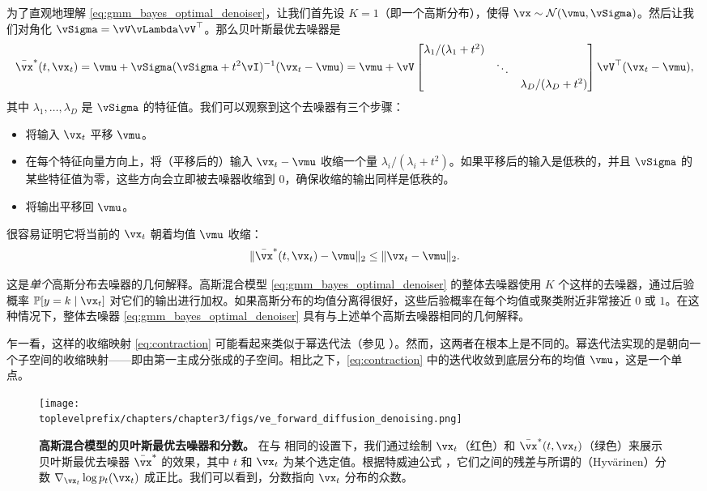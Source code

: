 \documentclass[../../book-main_zh.tex]{subfiles}
\begin{document}
\begin{example}[从高斯混合模型中去噪高斯噪声]
	为了直观地理解 \eqref{eq:gmm_bayes_optimal_denoiser}，让我们首先设 \(K = 1\)（即一个高斯分布），使得 \(\vx \sim \dNorm(\vmu, \vSigma)\)。然后让我们对角化 \(\vSigma = \vV\vLambda \vV^{\top}\)。那么贝叶斯最优去噪器是
	\begin{equation}
		\bar{\vx}^{\ast}(t, \vx_{t}) = \vmu + \vSigma(\vSigma + t^{2}\vI)^{-1}(\vx_{t} - \vmu) = \vmu + \vV\mat{\lambda_{1}/(\lambda_{1} + t^{2}) & & \\ & \ddots & \\ & & \lambda_{D}/(\lambda_{D} + t^{2})}\vV^{\top}(\vx_{t} - \vmu),
	\end{equation}
	其中 \(\lambda_{1}, \dots, \lambda_{D}\) 是 \(\vSigma\) 的特征值。我们可以观察到这个去噪器有三个步骤：
	\begin{itemize}
		\item 将输入 \(\vx_{t}\) 平移 \(\vmu\)。
		\item 在每个特征向量方向上，将（平移后的）输入 \(\vx_{t} - \vmu\) 收缩一个量 \(\lambda_{i}/(\lambda_{i} + t^{2})\)。如果平移后的输入是低秩的，并且 \(\vSigma\) 的某些特征值为零，这些方向会立即被去噪器收缩到 \(0\)，确保收缩的输出同样是低秩的。
		\item 将输出平移回 \(\vmu\)。
	\end{itemize}
	很容易证明它将当前的 \(\vx_{t}\) 朝着均值 \(\vmu\) 收缩：
	\begin{equation}\label{eq:contraction}
		\norm{\bar{\vx}^{\ast}(t, \vx_{t}) - \vmu}_{2} \leq \norm{\vx_{t} - \vmu}_{2}.
	\end{equation}

	这是\textit{单个}高斯分布去噪器的几何解释。高斯混合模型 \eqref{eq:gmm_bayes_optimal_denoiser} 的整体去噪器使用 \(K\) 个这样的去噪器，通过后验概率 \(\Pr[y = k \mid \vx_{t}]\) 对它们的输出进行加权。如果高斯分布的均值分离得很好，这些后验概率在每个均值或聚类附近非常接近 \(0\) 或 \(1\)。在这种情况下，整体去噪器 \eqref{eq:gmm_bayes_optimal_denoiser} 具有与上述单个高斯去噪器相同的几何解释。

    乍一看，这样的收缩映射 \eqref{eq:contraction} 可能看起来类似于幂迭代法（参见 ）。然而，这两者在根本上是不同的。幂迭代法实现的是朝向一个子空间的收缩映射——即由第一主成分张成的子空间。相比之下，\eqref{eq:contraction} 中的迭代收敛到底层分布的均值 \(\vmu\)，这是一个单点。
\end{example}

\begin{figure}
	\centering 
	\texttt{[image: \\toplevelprefix/chapters/chapter3/figs/ve\_forward\_diffusion\_denoising.png]}\vspace{-0.15in}
	\caption{\small \textbf{高斯混合模型的贝叶斯最优去噪器和分数。} 在与  相同的设置下，我们通过绘制 \(\vx_{t}\)（红色）和 \(\bar{\vx}^{\ast}(t, \vx_{t})\)（绿色）来展示贝叶斯最优去噪器 \(\bar{\vx}^{\ast}\) 的效果，其中 \(t\) 和 \(\vx_{t}\) 为某个选定值。根据特威迪公式 ，它们之间的残差与所谓的（Hyv\"arinen）分数 \(\nabla_{\vx_{t}}\log p_{t}(\vx_{t})\) 成正比。我们可以看到，分数指向 \(\vx_{t}\) 分布的众数。}
	\label{fig:ve_forward_denoising}
\end{figure}
\end{document}

